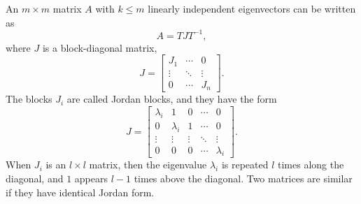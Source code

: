 \begin{fact}
An $m \times m$ matrix $A$ with $k \leq m$ linearly independent eigenvectors can be written as
\begin{equation*}
A = T J T^{-1} ,
\end{equation*}
where $J$ is a block-diagonal matrix,
\begin{equation*}
J = \left[ \begin{array}{ccc}
J_1 & \cdots & 0 \\
\vdots & \ddots & \vdots \\
0 & \cdots & J_n
\end{array} \right] .
\end{equation*}
The blocks $J_i$ are called Jordan blocks, and they have the form
\begin{equation*}
J = \left[ \begin{array}{ccccc}
\lambda_i & 1 & 0 &\cdots & 0 \\
0 & \lambda_i & 1 & \cdots & 0 \\
\vdots & \vdots & \vdots & \ddots & \vdots \\
0 & 0 & 0 & \cdots & \lambda_i
\end{array} \right] .
\end{equation*}
When $J_i$ is an $l \times l$ matrix, then the eigenvalue $\lambda_i$ is repeated $l$ times along the diagonal, and $1$ appears $l - 1$ times above the diagonal.
Two matrices are similar if they have identical Jordan form.
\end{fact}




